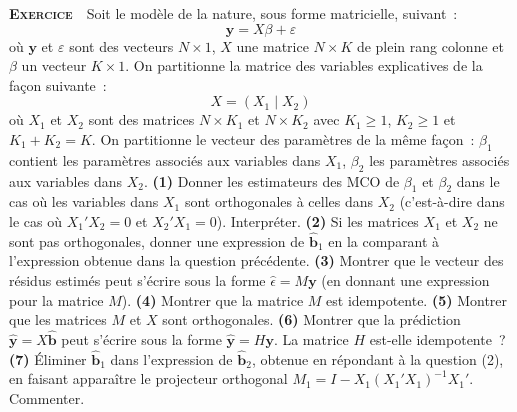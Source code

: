\documentclass[10pt,a4paper,notitlepage]{article}
\newcounter{xnumber}
\newcommand{\exercice}{\refstepcounter{xnumber}\textsc{\textbf{Exercice}} \textbf{\thexnumber}\,\,}
\newcommand{\question}[1]{\textbf{(#1)}}
\begin{document}
\bigskip

\exercice\label{ex:fwl} Soit le modèle de la nature, sous forme matricielle, suivant~:
\[
  \mathbf y = X \beta + \varepsilon
\]
où $\mathbf y$ et $\varepsilon$ sont des vecteurs $N\times 1$, $X$ une matrice
$N\times K$ de plein rang colonne et $\beta$ un vecteur $K\times 1$. On
partitionne la matrice des variables explicatives de la façon suivante~:
\[
X = \left(X_1 \mid X_2\right)
\]
où $X_1$ et $X_2$ sont des matrices $N \times K_1$ et $N\times K_2$ avec
$K_1\geq 1$, $K_2\geq 1$ et $K_1+K_2=K$. On partitionne le vecteur des
paramètres de la même façon~: $\beta_1$ contient les paramètres associés aux
variables dans $X_1$, $\beta_2$ les paramètres associés aux variables
dans $X_2$. \question{1} Donner les estimateurs des MCO de $\beta_1$
et $\beta_2$ dans le cas où les variables dans $X_1$ sont orthogonales à celles
dans $X_2$ (c'est-à-dire dans le cas où $X_1'X_2 = 0$ et $X_2'X_1=0$).
Interpréter. \question{2} Si les matrices $X_1$ et $X_2$ ne sont pas
orthogonales, donner une expression de $\hat{\mathbf b}_1$ en la comparant à
l'expression obtenue dans la question précédente. \question{3} Montrer que le
vecteur des résidus estimés peut s'écrire sous la forme
$\hat\epsilon = M \mathbf y$ (en donnant une expression pour la matrice $M$).
\question{4} Montrer que la matrice $M$ est idempotente. \question{5} Montrer
que les matrices $M$ et $X$ sont orthogonales. \question{6} Montrer que la
prédiction $\hat{\mathbf y} = X\hat{\mathbf b}$ peut s'écrire sous la forme
$\hat{\mathbf y} = H \mathbf y$. La matrice $H$ est-elle idempotente~?
\question{7} Éliminer $\hat{\mathbf b}_1$ dans l'expression
de $\hat{\mathbf b}_2$, obtenue en répondant à la question (2), en faisant
apparaître le projecteur orthogonal $M_1 = I-X_1(X_1'X_1)^{-1}X_1'$.
Commenter.\newline

\bigskip
\end{document}
